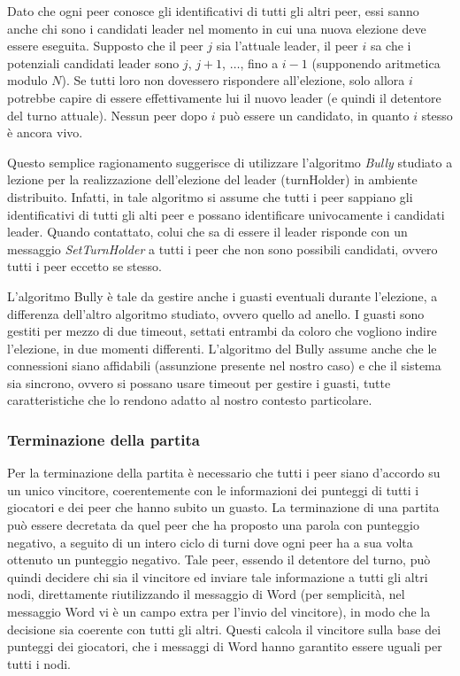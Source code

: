 \documentclass[9pt]{article}
\begin{document}
Dato che ogni peer conosce gli identificativi di tutti gli altri peer, essi sanno anche chi sono i candidati leader nel momento in cui una nuova elezione deve essere eseguita. Supposto che il peer $j$ sia l'attuale leader, il peer $i$ sa che i potenziali candidati leader sono $j$, $j+1$, $\dots$, fino a $i-1$ (supponendo aritmetica modulo $N$). Se tutti loro non dovessero rispondere all'elezione, solo allora $i$ potrebbe capire di essere effettivamente lui il nuovo leader (e quindi il detentore del turno attuale). Nessun peer dopo $i$ può essere un candidato, in quanto $i$ stesso è ancora vivo.

Questo semplice ragionamento suggerisce di utilizzare l'algoritmo \emph{Bully} studiato a lezione per la realizzazione dell'elezione del leader (turnHolder) in ambiente distribuito. Infatti, in tale algoritmo si assume che tutti i peer sappiano gli identificativi di tutti gli alti peer e possano identificare univocamente i candidati leader. Quando contattato, colui che sa di essere il leader risponde con un messaggio \emph{SetTurnHolder} a tutti i peer che non sono possibili candidati, ovvero tutti i peer eccetto se stesso.

L'algoritmo Bully è tale da gestire anche i guasti eventuali durante l'elezione, a differenza dell'altro algoritmo studiato, ovvero quello ad anello. I guasti sono gestiti per mezzo di due timeout, settati entrambi da coloro che vogliono indire l'elezione, in due momenti differenti. L'algoritmo del Bully assume anche che le connessioni siano affidabili (assunzione presente nel nostro caso) e che il sistema sia sincrono, ovvero si possano usare timeout per gestire i guasti, tutte caratteristiche che lo rendono adatto al nostro contesto particolare.


\subsubsection*{Terminazione della partita}

Per la terminazione della partita è necessario che tutti i peer siano d'accordo su un unico vincitore, coerentemente con le informazioni dei punteggi di tutti i giocatori e dei peer che hanno subito un guasto. La terminazione di una partita può essere decretata da quel peer che ha proposto una parola con punteggio negativo, a seguito di un intero ciclo di turni dove ogni peer ha a sua volta ottenuto un punteggio negativo. Tale peer, essendo il detentore del turno, può quindi decidere chi sia il vincitore ed inviare tale informazione a tutti gli altri nodi, direttamente riutilizzando il messaggio di Word (per semplicità, nel messaggio Word vi è un campo extra per l'invio del vincitore), in modo che la decisione sia coerente con tutti gli altri. Questi calcola il vincitore sulla base dei punteggi dei giocatori, che i messaggi di Word hanno garantito essere uguali per tutti i nodi.
\end{document}
